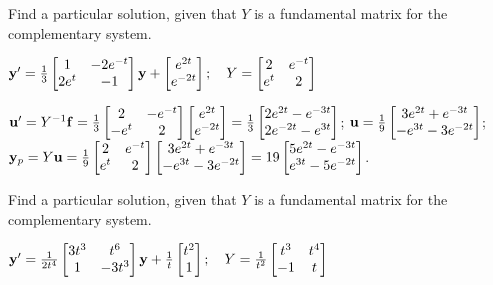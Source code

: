 \documentclass{ximera}
\begin{document}
 \begin{problem}\label{exer:10.7.14}
 Find a particular solution, given that $Y$ is a fundamental matrix for the complementary system.
 
$ {\bf y}'=\frac{1}{3}\begin{bmatrix}1&-2e^{-t}\\2e^t&-1\end{bmatrix}{\bf y}+
\begin{bmatrix}e^{2t}
\\e^{-2t}\end{bmatrix};  \quad Y=\begin{bmatrix}
2&e^{-t}\\e^t&2
\end{bmatrix}$

\begin{solution}
    ${\bf u}'=Y^{-1}{\bf f}=
\frac{1}{3}\begin{bmatrix}2&-e^{-t}\\-e^t&2\end{bmatrix}
\begin{bmatrix}e^{2t}\\e^{-2t}\end{bmatrix}=
\frac{1}{3}\begin{bmatrix}
2e^{2t}-e^{-3t}\\2e^{-2t}-e^{3t}\end{bmatrix}$;
${\bf u}=
\frac{1}{9}\begin{bmatrix}
3e^{2t}+e^{-3t}\\-e^{3t}-3e^{-2t}\end{bmatrix}$;
${\bf y}_p=Y{\bf u}=
\frac{1}{9}\begin{bmatrix}
2&e^{-t}\\e^t&2\end{bmatrix}
\begin{bmatrix}
3e^{2t}+e^{-3t}\\-e^{3t}-3e^{-2t}\end{bmatrix}=
{1}{9}\begin{bmatrix}
5e^{2t}-e^{-3t}\\e^{3t}-5e^{-2t}\end{bmatrix}$.
\end{solution}
\end{problem}

 \begin{problem}\label{exer:10.7.15}
 Find a particular solution, given that $Y$ is a fundamental matrix for the complementary system.
 
$ {\bf y}'=\frac{1}{2t^4}\begin{bmatrix}3t^3&t^6\\1&-3t^3\end{bmatrix}{\bf y}+
\frac{1}{t}\begin{bmatrix}
t^2\\1\end{bmatrix};  \quad Y=\frac{1}{t^2}\begin{bmatrix}
t^3&t^4\\-1&t
\end{bmatrix}$
\end{problem}
\end{document}

